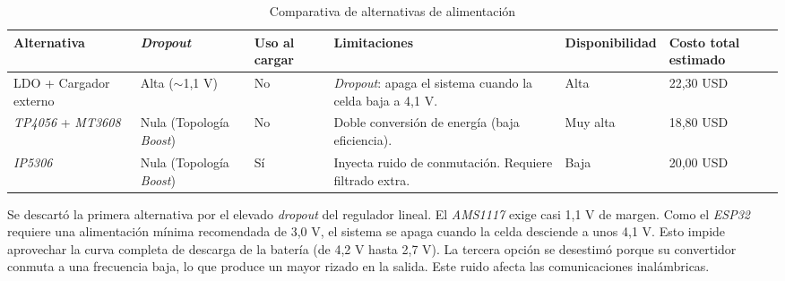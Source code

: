 \begin{table}[H]
    \centering
    \caption{Comparativa de alternativas de alimentación}
    \label{tab:comparativa_alimentacion}
    \begin{tabular}{|p{2cm}|p{2cm}|p{1.3cm}|p{3.2cm}|p{2.4cm}|p{2cm}|}
        \hline
        \textbf{Alternativa} & \textbf{\emph{Dropout}} & \textbf{Uso al cargar} & \textbf{Limitaciones} & \textbf{Disponibilidad} & \textbf{Costo total estimado} \\
        \hline
        \raggedright LDO + \newline Cargador externo & \raggedright Alta \newline ($\sim$1,1 V) & No & \raggedright \emph{Dropout}: apaga el sistema cuando la celda baja a 4,1 V. & Alta & 22,30 USD \\
        \hline
        \raggedright \emph{TP4056} + \newline \emph{MT3608} & \raggedright Nula \newline (Topología \emph{Boost}) & No & \raggedright Doble conversión de energía (baja eficiencia). & Muy alta & 18,80 USD \\
        \hline
        \raggedright \emph{IP5306} & \raggedright Nula \newline (Topología \emph{Boost}) & Sí & \raggedright Inyecta ruido de conmutación. \newline Requiere filtrado extra. & Baja & 20,00 USD \\
        \hline
    \end{tabular}
\end{table}

Se descartó la primera alternativa por el elevado \emph{dropout} del regulador lineal. El \emph{AMS1117} exige casi 1,1 V de margen. Como el \emph{ESP32} requiere una alimentación mínima recomendada de 3,0 V, el sistema se apaga cuando la celda desciende a unos 4,1 V. Esto impide aprovechar la curva completa de descarga de la batería (de 4,2 V hasta 2,7 V). La tercera opción se desestimó porque su convertidor conmuta a una frecuencia baja, lo que produce un mayor rizado en la salida. Este ruido afecta las comunicaciones inalámbricas.

